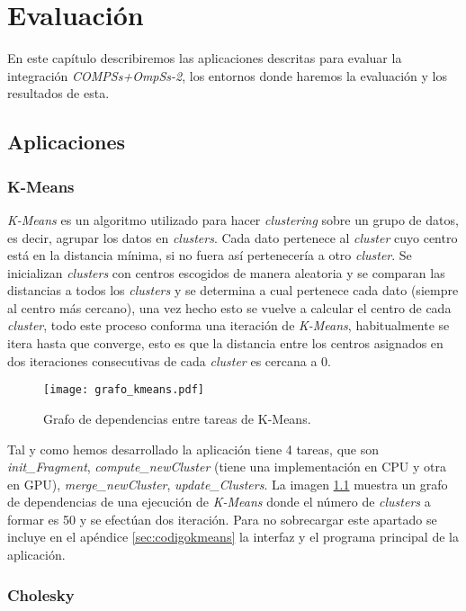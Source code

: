 \chapter{Evaluación}
\label{sec:estudiorend}

En este capítulo describiremos las aplicaciones descritas para evaluar la integración \textit{COMPSs+OmpSs-2}, los entornos donde haremos la evaluación y los resultados de esta.  

\section{Aplicaciones}
\subsection{K-Means}

\textit{K-Means} es un algoritmo utilizado para hacer \textit{clustering} sobre un grupo de datos, es decir, agrupar los datos en \textit{clusters}. Cada dato pertenece al \textit{cluster} cuyo centro está en la distancia mínima, si no fuera así pertenecería a otro \textit{cluster}. Se inicializan \textit{clusters} con centros escogidos de manera aleatoria y se comparan las distancias a todos los \textit{clusters} y se determina a cual pertenece cada dato (siempre al centro más cercano), una vez hecho esto se vuelve a calcular el centro de cada \textit{cluster}, todo este proceso conforma una iteración de \textit{K-Means}, habitualmente se itera hasta que converge, esto es que la distancia entre los centros asignados en dos iteraciones consecutivas de cada \textit{cluster} es cercana a 0.

\begin{figure}[h]
	\centering 
	\caption{Grafo de dependencias entre tareas de K-Means.}
	\texttt{[image: grafo\_kmeans.pdf]}
	\label{fig:grafokmeans}
\end{figure}

Tal y como hemos desarrollado la aplicación tiene 4 tareas, que son \textit{init\_Fragment}, \textit{compute\_newCluster} (tiene una implementación en CPU y otra en GPU), \textit{merge\_newCluster}, \textit{update\_Clusters}. La imagen \ref{fig:grafokmeans} muestra un grafo de dependencias de una ejecución de \textit{K-Means} donde el número de \textit{clusters} a formar es 50 y se efectúan dos iteración. Para no sobrecargar este apartado se incluye en el apéndice \ref{sec:codigokmeans} la interfaz y el programa principal de la aplicación.

\subsection{Cholesky}

